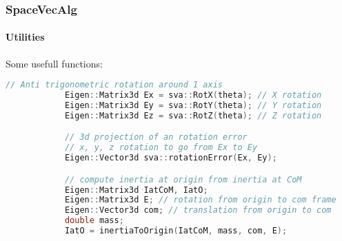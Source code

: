 \documentclass{beamer}
\begin{document}
  	\begin{frame}[fragile]
		\frametitle{SpaceVecAlg}
		\framesubtitle{Utilities}
		Some usefull functions:
		\begin{lstlisting}[language=C++]
			// Anti trigonometric rotation around 1 axis
			Eigen::Matrix3d Ex = sva::RotX(theta); // X rotation
			Eigen::Matrix3d Ey = sva::RotY(theta); // Y rotation
			Eigen::Matrix3d Ez = sva::RotZ(theta); // Z rotation

			// 3d projection of an rotation error
			// x, y, z rotation to go from Ex to Ey
			Eigen::Vector3d sva::rotationError(Ex, Ey);

			// compute inertia at origin from inertia at CoM
			Eigen::Matrix3d IatCoM, IatO;
			Eigen::Matrix3d E; // rotation from origin to com frame
			Eigen::Vector3d com; // translation from origin to com
			double mass;
			IatO = inertiaToOrigin(IatCoM, mass, com, E);
		\end{lstlisting}
	\end{frame}
\end{document}
